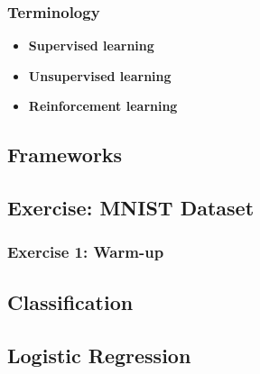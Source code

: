 \documentclass[aspectratio=169]{beamer}
\begin{document}
\begin{frame}
\frametitle{Terminology}
    \begin{itemize}
        \item \textbf{Supervised learning}
        \item \textbf{Unsupervised learning}
        \item \textbf{Reinforcement learning}
    \end{itemize}
\end{frame}


\subsection{Frameworks}

\subsection{Exercise: MNIST Dataset}

\begin{frame}
    \frametitle{Exercise 1: Warm-up}
    \begin{figure}
        \centering
    \end{figure}
\end{frame}

\subsection{Classification}
\subsection{Logistic Regression}
\end{document}
